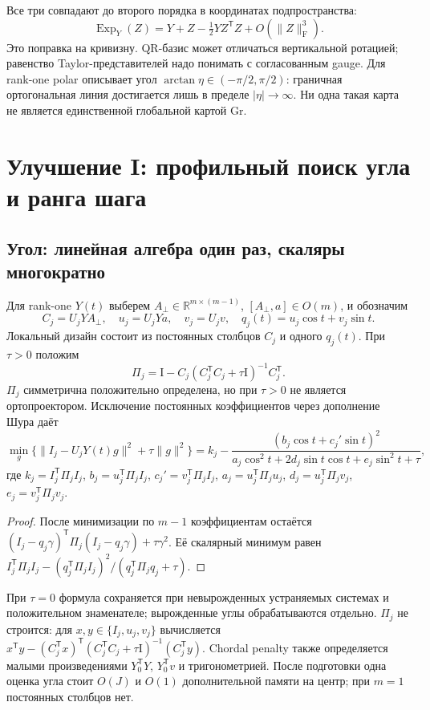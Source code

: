 \documentclass[11pt,a4paper]{article}
\newcommand{\R}{\mathbb R}
\newcommand{\Id}{\mathrm I}
\newcommand{\T}{^{\mathsf T}}
\newcommand{\F}{_{\mathrm F}}
\newcommand{\Gr}{\mathrm{Gr}}
\newcommand{\Exp}{\operatorname{Exp}}
\begin{document}
Все три совпадают до второго порядка в координатах подпространства:
\begin{equation}\label{eq:taylor}
 \Exp_Y(Z)=Y+Z-\tfrac12YZ\T Z+O(\|Z\|\F^3).
\end{equation}
Это поправка на кривизну. QR-базис может отличаться вертикальной ротацией;
равенство Taylor-представителей надо понимать с согласованным gauge.
Для rank-one polar описывает угол $\arctan\eta\in(-\pi/2,\pi/2)$:
граничная ортогональная линия достигается лишь в пределе $|\eta|\to\infty$.
Ни одна такая карта не является единственной глобальной картой $\Gr$.

\section{Улучшение I: профильный поиск угла и ранга шага}\label{sec:angles}

\subsection{Угол: линейная алгебра один раз, скаляры многократно}
Для rank-one $Y(t)$ выберем $A_\perp\in\R^{m\times(m-1)}$,
$[A_\perp,a]\in O(m)$, и обозначим
\[
 C_j=U_jYA_\perp,\quad u_j=U_jYa,\quad v_j=U_jv,\quad
 q_j(t)=u_j\cos t+v_j\sin t.
\]
Локальный дизайн состоит из постоянных столбцов $C_j$ и одного $q_j(t)$.
При $\tau>0$ положим
\begin{equation}\label{eq:schur}
 \Pi_j=\Id-C_j(C_j\T C_j+\tau\Id)^{-1}C_j\T.
\end{equation}
$\Pi_j$ симметрична положительно определена, но при $\tau>0$
не является ортопроектором. Исключение постоянных коэффициентов
через дополнение Шура даёт
\begin{equation}\label{eq:scalarprofile}
 \min_g\{\|I_j-U_jY(t)g\|^2+\tau\|g\|^2\}
  =k_j-\frac{(b_j\cos t+c_j'\sin t)^2}
 {a_j\cos^2t+2d_j\sin t\cos t+e_j\sin^2t+\tau},
\end{equation}
где $k_j=I_j\T\Pi_jI_j$, $b_j=u_j\T\Pi_jI_j$,
$c_j'=v_j\T\Pi_jI_j$, $a_j=u_j\T\Pi_ju_j$,
$d_j=u_j\T\Pi_jv_j$, $e_j=v_j\T\Pi_jv_j$.
\begin{proof}
После минимизации по $m-1$ коэффициентам остаётся
$(I_j-q_j\gamma)\T\Pi_j(I_j-q_j\gamma)+\tau\gamma^2$.
Её скалярный минимум равен
$I_j\T\Pi_jI_j-(q_j\T\Pi_jI_j)^2/(q_j\T\Pi_jq_j+\tau)$.
\end{proof}
При $\tau=0$ формула сохраняется при невырожденных устраняемых системах
и положительном знаменателе; вырожденные углы обрабатываются отдельно.
$\Pi_j$ не строится: для $x,y\in\{I_j,u_j,v_j\}$ вычисляется
$x\T y-(C_j\T x)\T(C_j\T C_j+\tau\Id)^{-1}(C_j\T y)$.
Chordal penalty также определяется малыми произведениями $Y_0\T Y$,
$Y_0\T v$ и тригонометрией. После подготовки одна оценка угла стоит
$O(J)$ и $O(1)$ дополнительной памяти на центр;
при $m=1$ постоянных столбцов нет.
\end{document}
